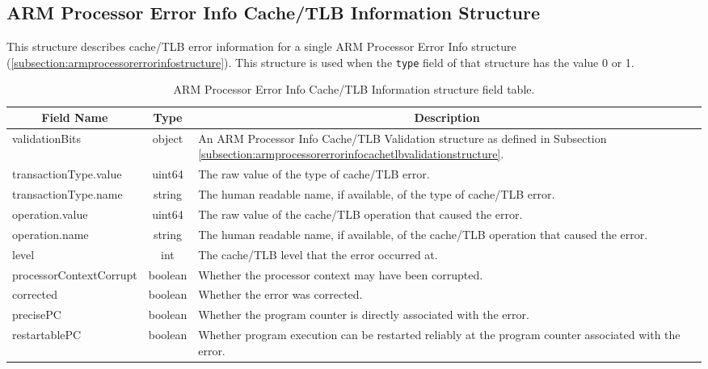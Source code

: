 \documentclass{report}
\newcommand*{\thead}[1]{\multicolumn{1}{|c|}{\bfseries #1}}
\newcommand*{\jsontable}[1]{
    \begin{table}[!ht]
    \label{#1}
    \centering
    \begin{adjustbox}{center}
    \begin{tabular}{|l|c|p{8cm}|}
    \hline
    \thead{Field Name} & \thead{Type} & \thead{Description} \\
    \hline
}
\newcommand*{\jsontableend}[1]{
    \hline
    \end{tabular}
    \end{adjustbox}
    \caption{#1}
    \label{table:#1}
    \end{table}
    \FloatBarrier
}
\begin{document}
\subsection{ARM Processor Error Info Cache/TLB Information Structure}
\label{subsection:armprocessorerrorinfoerrorinformationcachetlbstructure}
This structure describes cache/TLB error information for a single ARM Processor Error Info structure (\ref{subsection:armprocessorerrorinfostructure}). This structure is used when the \texttt{type} field of that structure has the value 0 or 1.
\jsontable{table:armprocessorerrorinfoerrorinformationcachetlbstructure}
validationBits & object & An ARM Processor Info Cache/TLB Validation structure as defined in Subsection \ref{subsection:armprocessorerrorinfocachetlbvalidationstructure}.\\
\hline
transactionType.value & uint64 & The raw value of the type of cache/TLB error.\\
transactionType.name & string & The human readable name, if available, of the type of cache/TLB error.\\
\hline
operation.value & uint64 & The raw value of the cache/TLB operation that caused the error.\\
operation.name & string & The human readable name, if available, of the cache/TLB operation that caused the error.\\
\hline
level & int & The cache/TLB level that the error occurred at.\\
\hline
processorContextCorrupt & boolean & Whether the processor context may have been corrupted.\\
\hline
corrected & boolean & Whether the error was corrected.\\
\hline
precisePC & boolean & Whether the program counter is directly associated with the error.\\
\hline
restartablePC & boolean & Whether program execution can be restarted reliably at the program counter associated with the error.\\
\jsontableend{ARM Processor Error Info Cache/TLB Information structure field table.}

\end{document}
